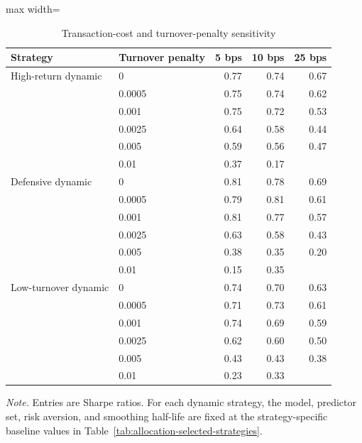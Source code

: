 ﻿\begin{table}[H]
\centering
\caption{Transaction-cost and turnover-penalty sensitivity}
\label{tab:allocation-cost-turnover-sensitivity}
\small
\begin{adjustbox}{max width=\linewidth}
\begin{tabular}{llrrr}
\toprule
Strategy & Turnover penalty & 5 bps & 10 bps & 25 bps \\
\midrule
High-return dynamic & 0 & 0.77 & 0.74 & 0.67 \\
 & 0.0005 & 0.75 & 0.74 & 0.62 \\
 & 0.001 & 0.75 & 0.72 & 0.53 \\
 & 0.0025 & 0.64 & 0.58 & 0.44 \\
 & 0.005 & 0.59 & 0.56 & 0.47 \\
 & 0.01 & 0.37 & 0.17 &  \\
\addlinespace
Defensive dynamic & 0 & 0.81 & 0.78 & 0.69 \\
 & 0.0005 & 0.79 & 0.81 & 0.61 \\
 & 0.001 & 0.81 & 0.77 & 0.57 \\
 & 0.0025 & 0.63 & 0.58 & 0.43 \\
 & 0.005 & 0.38 & 0.35 & 0.20 \\
 & 0.01 & 0.15 & 0.35 &  \\
\addlinespace
Low-turnover dynamic & 0 & 0.74 & 0.70 & 0.63 \\
 & 0.0005 & 0.71 & 0.73 & 0.61 \\
 & 0.001 & 0.74 & 0.69 & 0.59 \\
 & 0.0025 & 0.62 & 0.60 & 0.50 \\
 & 0.005 & 0.43 & 0.43 & 0.38 \\
 & 0.01 & 0.23 & 0.33 &  \\
\bottomrule
\end{tabular}
\end{adjustbox}
\vspace{0.25em}
\begin{minipage}{0.92\linewidth}\footnotesize
\emph{Note.} Entries are Sharpe ratios. For each dynamic strategy, the model, predictor set, risk aversion, and smoothing half-life are fixed at the strategy-specific baseline values in Table~\ref{tab:allocation-selected-strategies}.
\end{minipage}
\end{table}

